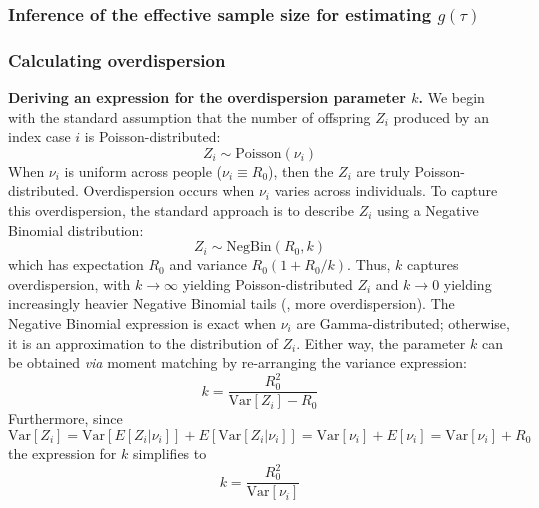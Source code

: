 \subsubsection{Inference of the effective sample size for estimating $g(\tau)$}
\label{sec:supplementary_methods_neff}

\clearpage


\subsubsection{Calculating overdispersion}
\label{sec:supplementary_methods_overdispersion}

{\bf \boldmath Deriving an expression for the overdispersion parameter $k$.} We begin with the standard assumption that the number of offspring $Z_i$ produced by an index case $i$ is Poisson-distributed: 
\begin{equation}
	Z_i \sim \text{Poisson}(\nu_i)
\end{equation}
When $\nu_i$ is uniform across people ($\nu_i \equiv R_0$), then the $Z_i$ are truly Poisson-distributed. Overdispersion occurs when $\nu_i$ varies across individuals. To capture this overdispersion, the standard approach is to describe $Z_i$ using a Negative Binomial distribution: 
\begin{equation}
	Z_i \sim \text{NegBin}(R_0, k)
\end{equation}
which has expectation $R_0$ and variance $R_0 (1 + R_0 / k)$. Thus, $k$ captures overdispersion, with $k \rightarrow \infty$ yielding Poisson-distributed $Z_i$ and $k \rightarrow 0$ yielding increasingly heavier Negative Binomial tails (\ie, more overdispersion). The Negative Binomial expression is exact when $\nu_i$ are Gamma-distributed; otherwise, it is an approximation to the distribution of $Z_i$. Either way, the parameter $k$ can be obtained {\it via} moment matching by re-arranging the variance expression: 
\begin{equation}
	k = \frac{R_0^2}{\text{Var}[Z_i] - R_0}
\end{equation}
Furthermore, since
\begin{equation}
	\text{Var}[Z_i] = \text{Var}[E[Z_i | \nu_i]] + E[\text{Var}[Z_i | \nu_i]] = \text{Var}[\nu_i] + E[\nu_i] = \text{Var}[\nu_i] + R_0
\end{equation}
the expression for $k$ simplifies to 
\begin{equation}
	k = \frac{R_0^2}{\text{Var}[\nu_i]}
	\label{eq:k_expression}
\end{equation}

